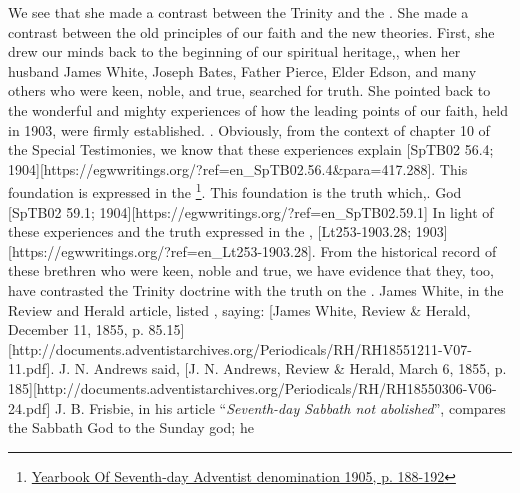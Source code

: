 We see that she made a contrast between the Trinity and the . She made a contrast between the old principles of our faith and the new theories. First, she drew our minds back to the beginning of our spiritual heritage,, when her husband James White, Joseph Bates, Father Pierce, Elder Edson, and many others who were keen, noble, and true, searched for truth. She pointed back to the wonderful and mighty experiences of how the leading points of our faith, held in 1903, were firmly established.   . Obviously, from the context of chapter 10 of the Special Testimonies, we know that these experiences explain [SpTB02 56.4; 1904][https://egwwritings.org/?ref=en\_SpTB02.56.4\&para=417.288]. This foundation is expressed in the \footnote{\href{https://static1.squarespace.com/static/554c4998e4b04e89ea0c4073/t/59d17e24c027d84167e17617/1506901547915/SDA-YB1905+\%28P.+188-192\%29.pdf}{Yearbook Of Seventh-day Adventist denomination 1905, p. 188-192}}. This foundation is the truth which,. God [SpTB02 59.1; 1904][https://egwwritings.org/?ref=en\_SpTB02.59.1] In light of these experiences and the truth expressed in the , [Lt253-1903.28; 1903][https://egwwritings.org/?ref=en\_Lt253-1903.28]. From the historical record of these brethren who were keen, noble and true, we have evidence that they, too, have contrasted the Trinity doctrine with the truth on the . James White, in the Review and Herald article, listed , saying: [James White, Review \& Herald, December 11, 1855, p. 85.15][http://documents.adventistarchives.org/Periodicals/RH/RH18551211-V07-11.pdf]. J. N. Andrews said, [J. N. Andrews, Review \& Herald, March 6, 1855, p. 185][http://documents.adventistarchives.org/Periodicals/RH/RH18550306-V06-24.pdf] J. B. Frisbie, in his article “\textit{Seventh-day Sabbath not abolished}”, compares the Sabbath God to the Sunday god; he 